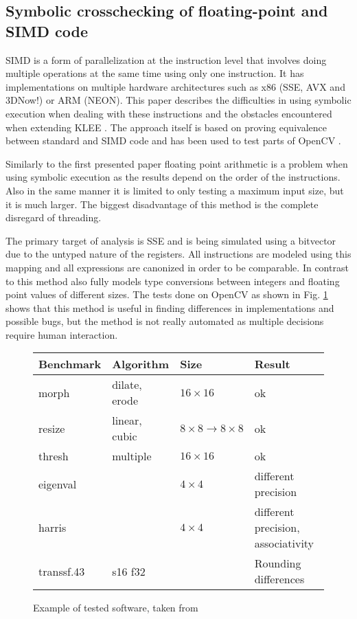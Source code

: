 \documentclass[10pt]{llncs}
\begin{document}
\subsection{Symbolic crosschecking of floating-point and SIMD code \cite{base6}}

SIMD is a form of parallelization at the instruction level that involves doing multiple operations at the same time using only one instruction. It has implementations on multiple hardware architectures such as x86 (SSE, AVX and 3DNow!) or ARM (NEON). This paper describes the difficulties in using symbolic execution when dealing with these instructions and the obstacles encountered when extending KLEE \cite{klee}. The approach itself is based on proving equivalence between standard and SIMD code and has been used to test parts of OpenCV \cite{opencv}.

Similarly to the first presented paper \cite{base1} floating point arithmetic is a problem when using symbolic execution as the results depend on the order of the instructions. Also in the same manner it is limited to only testing a maximum input size, but it is much larger. The biggest disadvantage of this method is the complete disregard of threading.

The primary target of analysis is SSE and is being simulated using a bitvector due to the untyped nature of the registers. All instructions are modeled using this mapping and all expressions are canonized in order to be comparable. In contrast to \cite{base1} this method also fully models type conversions between integers and floating point values of different sizes. The tests done on OpenCV as shown in Fig. \ref{example:6} shows that this method is useful in finding differences in implementations and possible bugs, but the method is not really automated as multiple decisions require human interaction.

\begin{figure}
	\centering
	
	\begin{tabular}{l l l l}
		Benchmark & Algorithm & Size & Result \\
		\hline
		morph & dilate, erode & $16 \times 16$ & ok \\
		resize & linear, cubic & $8 \times 8 \rightarrow 8 \times 8$ & ok \\
		thresh & multiple & $16 \times 16$ & ok \\
		eigenval & & $4 \times 4$ & different precision \\
		harris & & $4 \times 4$ & different precision, associativity \\
		transsf.43 & s16 f32 & & Rounding differences
	\end{tabular}
	
	\caption{Example of tested software, taken from \cite{base6}}
	\label{example:6}
\end{figure}
\end{document}
